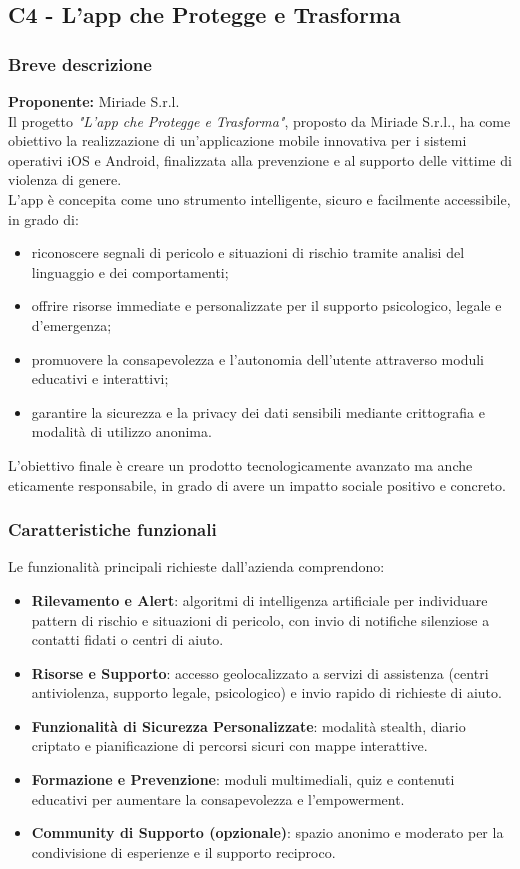 \documentclass[a4paper,11pt]{article}
\begin{document}
\subsection{C4 - L'app che Protegge e Trasforma}
\subsubsection{Breve descrizione}
\textbf{Proponente:} Miriade S.r.l.
\vspace{0.5em}\\
Il progetto \textit{"L'app che Protegge e Trasforma"}, proposto da Miriade S.r.l., ha come obiettivo la realizzazione di un'applicazione mobile innovativa per i sistemi operativi iOS e Android, finalizzata alla prevenzione e al supporto delle vittime di violenza di genere.\\

L'app è concepita come uno strumento intelligente, sicuro e facilmente accessibile, in grado di:
\begin{itemize}
  \item riconoscere segnali di pericolo e situazioni di rischio tramite analisi del linguaggio e dei comportamenti;
  \item offrire risorse immediate e personalizzate per il supporto psicologico, legale e d'emergenza;
  \item promuovere la consapevolezza e l'autonomia dell'utente attraverso moduli educativi e interattivi;
  \item garantire la sicurezza e la privacy dei dati sensibili mediante crittografia e modalità di utilizzo anonima.
\end{itemize}
L'obiettivo finale è creare un prodotto tecnologicamente avanzato ma anche eticamente responsabile, in grado di avere un impatto sociale positivo e concreto.

\subsubsection{Caratteristiche funzionali}
Le funzionalità principali richieste dall'azienda comprendono:
\begin{itemize}
  \item \textbf{Rilevamento e Alert}: algoritmi di intelligenza artificiale per individuare pattern di rischio e situazioni di pericolo, con invio di notifiche silenziose a contatti fidati o centri di aiuto.
  \item \textbf{Risorse e Supporto}: accesso geolocalizzato a servizi di assistenza (centri antiviolenza, supporto legale, psicologico) e invio rapido di richieste di aiuto.
  \item \textbf{Funzionalità di Sicurezza Personalizzate}: modalità stealth, diario criptato e pianificazione di percorsi sicuri con mappe interattive.
  \item \textbf{Formazione e Prevenzione}: moduli multimediali, quiz e contenuti educativi per aumentare la consapevolezza e l'empowerment.
  \item \textbf{Community di Supporto (opzionale)}: spazio anonimo e moderato per la condivisione di esperienze e il supporto reciproco.
\end{itemize}
\end{document}
